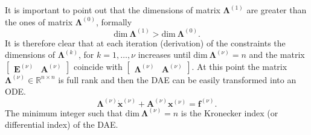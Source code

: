 		It is important to point out that the dimensions of matrix 
		$\bm{\Lambda}^{(1)}$ are greater than the ones of matrix $\bm{\Lambda}^{(0)}$, 
		formally
		\begin{equation}
			\textrm{dim}~\bm{\Lambda}^{(1)} > \textrm{dim}~\bm{\Lambda}^{(0)}.
		\end{equation}
		It is therefore clear that at each iteration (derivation) of the constraints 
		the dimensions of $\bm{\Lambda}^{(k)}$, for $k = 1, \dots, \nu$ increases 
		until $\textrm{dim}~\bm{\Lambda}^{(\nu)} = n$ and the matrix 
		$\begin{bmatrix}\bm{E}^{(\nu)} & \bm{A}^{(\nu)}\end{bmatrix}$ 
		coincide with $ \begin{bmatrix}\bm{\Lambda}^{(\nu)} & 
		\bm{A}^{(\nu)}\end{bmatrix}$.
		At this point the matrix $\bm{\Lambda}^{(\nu)}\in\mathbb{R}^{n\times n}$
		is full rank and then the DAE can be easily transformed into an ODE.
		\begin{equation}
			\bm{\Lambda}^{(\nu)}\dot{\bm{x}}^{(\nu)}+ \bm{A}^{(\nu)}\bm{x}^{(\nu)} = \bm{f}^{(\nu)}.
		\end{equation}
		The minimum integer such that $\textrm{dim}~\bm{\Lambda}^{(\nu)} = n$
		is the Kronecker index (or differential index) of the DAE.
